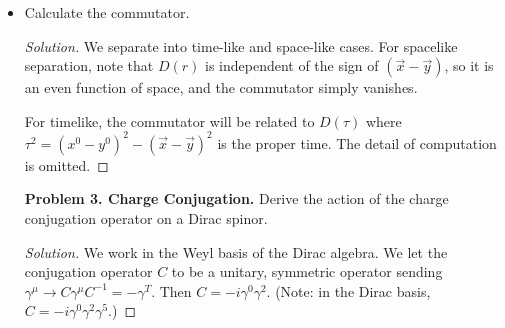 \begin{itemize}
\item Calculate the commutator.

\begin{proof}[Solution]
	We separate into time-like and space-like cases. For spacelike separation, note that $D(r)$ is independent of the sign of $(\vec{x}  - \vec{y} )$, so it is an even function of space, and the commutator simply vanishes.

	For timelike, the commutator will be related to $D(\tau)$ where $\tau^2 = (x^0 - y^0)^2 - (\vec{x}  - \vec{y} )^2$ is the proper time. The detail of computation is omitted.
\end{proof}


\textbf{Problem 3. Charge Conjugation.} Derive the action of the charge conjugation operator on a Dirac spinor.

\begin{proof}[Solution]
	We work in the Weyl basis of the Dirac algebra. We let the conjugation operator $C$ to be a unitary, symmetric operator sending $\gamma^\mu \to  C \gamma^\mu C^{-1} = - \gamma^T$. Then $C = - i \gamma^0 \gamma^2$. (Note: in the Dirac basis, $C = - i \gamma^0 \gamma^2 \gamma^5$.)

	
\end{proof}


	
\end{itemize}


